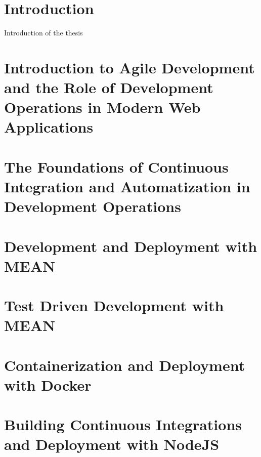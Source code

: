 \section{Introduction}
Introduction of the thesis

\newpage

\section{Introduction to Agile Development and the Role of Development Operations in Modern Web Applications
}
\label{section:Introduction to Agile Development and the Role of Development Operations in Modern Web Applications
}

\section{The Foundations of Continuous Integration and Automatization in Development Operations
}
\label{section:The Foundations of Continuous Integration and Automatization in Development Operations
}

\section{Development and Deployment with MEAN
}
\label{section:Development and Deployment with MEAN
}

\section{Test Driven Development with MEAN
}
\label{section:Test Driven Development with MEAN
}

\section{Containerization and Deployment with Docker
}
\label{section:Containerization and Deployment with Docker
}

\section{Building Continuous Integrations and Deployment with NodeJS
}
\label{section:Building Continuous Integrations and Deployment with NodeJS
}





